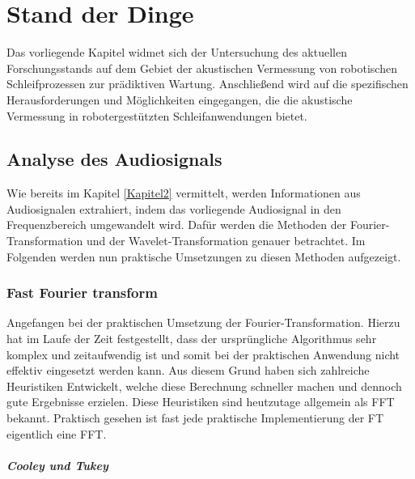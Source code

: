 \chapter{Stand der Dinge}
\label{Kapitel3}

Das vorliegende Kapitel widmet sich der Untersuchung des aktuellen Forschungsstands auf dem Gebiet der akustischen Vermessung von robotischen Schleifprozessen zur prädiktiven Wartung. Anschließend wird auf die spezifischen Herausforderungen und Möglichkeiten eingegangen, die die akustische Vermessung in robotergestützten Schleifanwendungen bietet.
    

\section{Analyse des Audiosignals}

Wie bereits im Kapitel \ref{Kapitel2} vermittelt, werden Informationen aus Audiosignalen extrahiert, indem das vorliegende Audiosignal in den Frequenzbereich umgewandelt wird. Dafür werden die Methoden der Fourier-Transformation und der Wavelet-Transformation genauer betrachtet. Im Folgenden werden nun praktische Umsetzungen zu diesen Methoden aufgezeigt.

\subsection{Fast Fourier transform}

Angefangen bei der praktischen Umsetzung der Fourier-Transformation. Hierzu hat im Laufe der Zeit festgestellt, dass der ursprüngliche Algorithmus sehr komplex und zeitaufwendig ist und somit bei der praktischen Anwendung nicht effektiv eingesetzt werden kann. Aus diesem Grund haben sich zahlreiche Heuristiken Entwickelt, welche diese Berechnung schneller machen und dennoch gute Ergebnisse erzielen. Diese Heuristiken sind heutzutage allgemein als \ac{FFT} bekannt. \cite[155f.]{Meyer2000} Praktisch gesehen ist fast jede praktische Implementierung der \ac{FT} eigentlich eine \ac{FFT}. \cite[6]{Heckbert1995}

\paragraph{Cooley und Tukey}
   
